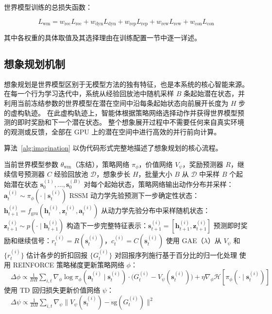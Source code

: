 \documentclass[12pt,a4paper]{ctexart}
\begin{document}
世界模型训练的总损失函数：

\begin{equation}
    L_{\text{wm}} = w_{\text{rec}} L_{\text{rec}} + w_{\text{dyn}} L_{\text{dyn}} + w_{\text{rep}} L_{\text{rep}} + w_{\text{rew}} L_{\text{rew}} + w_{\text{con}} L_{\text{con}}
    \label{eq:wm_loss}
\end{equation}

其中各权重的具体取值及其选择理由在训练配置一节中逐一详述。

\subsection{想象规划机制}

想象规划是世界模型区别于无模型方法的独有特征，也是本系统的核心智能来源。
在每一个行为学习迭代中，系统从经验回放池中随机采样 $B$ 条起始潜在状态，并利用当前冻结参数的世界模型在潜在空间中沿每条起始状态向前展开长度为 $H$ 步的虚构轨迹。
在此虚构轨迹上，智能体根据策略网络选择动作并获得世界模型预测的即时奖励和下一个潜在状态。
整个想象展开过程中不需要任何来自真实环境的观测或反馈，全部在 GPU 上的潜在空间中进行高效的并行前向计算。

算法~\ref{alg:imagination} 以伪代码形式完整地描述了想象规划的核心流程。

\begin{algorithm}[H]
\caption{潜在空间想象规划（Imagination Planning）}
\label{alg:imagination}
\begin{algorithmic}[1]
\Require 当前世界模型参数 $\theta_{\text{wm}}$（冻结），策略网络 $\pi_\phi$，价值网络 $V_\psi$，奖励预测器 $R$，继续信号预测器 $C$
\Require 经验回放池 $\mathcal{D}$，想象步长 $H$，批量大小 $B$
    \State 从 $\mathcal{D}$ 中采样 $B$ 个起始潜在状态 $\mathbf{s}_0^{(1)}, \ldots, \mathbf{s}_0^{(B)}$
        \State 对每个起始状态，策略网络输出动作分布并采样：$\mathbf{a}_t^{(i)} \sim \pi_\phi(\cdot \mid \mathbf{s}_t^{(i)})$
        \State RSSM 动力学先验预测下一步确定性状态：$\mathbf{h}_{t+1}^{(i)} = f_{\text{gru}}(\mathbf{h}_t^{(i)}, \mathbf{z}_t^{(i)}, \mathbf{a}_t^{(i)})$
        \State 从动力学先验分布中采样随机状态：$\mathbf{z}_{t+1}^{(i)} \sim p(\cdot \mid \mathbf{h}_{t+1}^{(i)})$
        \State 构造下一步完整特征表示：$\mathbf{s}_{t+1}^{(i)} = [\mathbf{h}_{t+1}^{(i)}, \mathbf{z}_{t+1}^{(i)}]$
        \State 预测即时奖励和继续信号：$r_t^{(i)} = R(\mathbf{s}_t^{(i)})$，$c_t^{(i)} = C(\mathbf{s}_t^{(i)})$
    \EndFor
    \State 使用 GAE（$\lambda$）从 $V_\psi$ 和 $\{r_t^{(i)}\}$ 估计各步的折扣回报 $\{G_t^{(i)}\}$
    \State 对回报序列施行基于百分比的归一化处理
    \State 使用 REINFORCE 策略梯度更新策略网络 $\phi$：
    \State $\quad \Delta\phi \propto \frac{1}{BH} \sum_{i,t} \nabla_\phi \log \pi_\phi(\mathbf{a}_t^{(i)} \mid \mathbf{s}_t^{(i)}) \cdot \big(G_t^{(i)} - V_\psi(\mathbf{s}_t^{(i)})\big) + \eta \nabla_\phi \mathcal{H}[\pi_\phi(\cdot \mid \mathbf{s}_t^{(i)})]$
    \State 使用 TD 回归损失更新价值网络 $\psi$：
    \State $\quad \Delta\psi \propto \frac{1}{BH} \sum_{i,t} \nabla_\psi \big\| V_\psi(\mathbf{s}_t^{(i)}) - \text{sg}(G_t^{(i)}) \big\|^2$
\EndFor
\end{algorithmic}
\end{algorithm}
\end{document}
